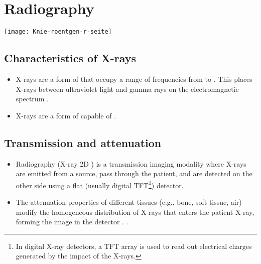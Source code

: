 \chapter{Radiography}
\vspace{-47ex}\hspace{38ex}
\texttt{[image: Knie-roentgen-r-seite]} %

\section{Characteristics of X-rays}
\begin{itemize}
\item X-rays are a form of  that occupy a range of frequencies from  to . This places X-rays between ultraviolet light
  and gamma rays on the electromagnetic spectrum
  \cite{bushberg2011essential}.
\item X-rays are a form of  capable of
  .
\end{itemize}

\section{Transmission and attenuation}
\begin{itemize}
\item Radiography (X-ray 2D ) is a transmission imaging modality where X-rays are
  emitted from a source, pass through the patient, and are detected on
  the other side using a flat (usually digital TFT\footnote{In digital
    X-ray detectors, a TFT array is used to read out electrical
    charges generated by the impact of the X-rays.}) detector.
\item The attenuation properties of different tissues
(e.g., bone, soft tissue, air) modify the homogeneous distribution of
X-rays that enters the patient X-ray, forming the image in the
detector \cite{bushberg2011essential}.
 \cite{bushberg2011essential}.
\end{itemize}
